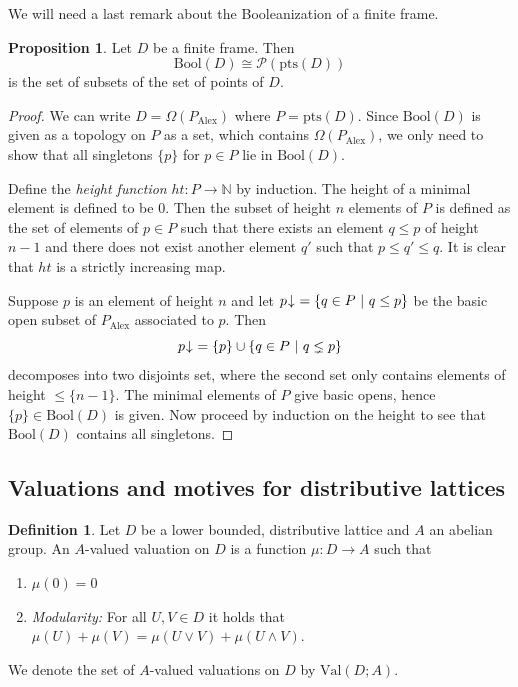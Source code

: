 \documentclass[10pt]{amsart}
\theoremstyle{definition}
\newtheorem{proposition}[theorem]{Proposition}
\newtheorem{definition}[theorem]{Definition}
\begin{document}
We will need a last remark about the Booleanization of a finite frame.

\begin{proposition} \label{finiteboolean}
Let $D$ be a finite frame. Then $$\mathrm{Bool}(D) \cong \mathcal{P}( \mathrm{pts}(D) )$$
is the set of subsets of the set of points of $D$.
\end{proposition}


\begin{proof}
We can write $D = \Omega(P_{\mathrm{Alex}})$ where $P = \mathrm{pts}(D)$. Since $\mathrm{Bool}(D)$ is given as a topology on $P$ as a set, which contains $\Omega(P_{\mathrm{Alex}})$, we only need to show that all singletons $\{p\}$ for $p \in P$ lie in $\mathrm{Bool}(D)$.

Define the \emph{height function} $ht : P \rightarrow \mathbb{N}$ by induction. The height of a minimal element is defined to be $0$. Then the subset of height $n$ elements of $P$ is defined as the set of elements of $p \in P$ such that there exists an element $q \leq p$ of height $n-1$ and there does not exist another element $q'$ such that $p \leq q' \leq q$. It is clear that $ht$ is a strictly increasing map.

Suppose $p$ is an element of height $n$ and let $p \hspace{-0.5ex}\downarrow ~= \{ q \in P ~|~ q \leq p \}$ be the basic open subset of $P_{\mathrm{Alex}}$ associated to $p$. Then
$$p \hspace{-0.5ex}\downarrow ~= \{p\} \cup \{ q \in P ~|~ q \lneq p \}$$
decomposes into two disjoints set, where the second set only contains elements of height $\leq \{n-1\}$. The minimal elements of $P$ give basic opens, hence $\{p\} \in \mathrm{Bool}(D)$ is given. Now proceed by induction on the height to see that $\mathrm{Bool}(D)$ contains all singletons.
\end{proof}


\subsection{Valuations and motives for distributive lattices}
\label{sectionvaluations}

\begin{definition}
Let $D$ be a lower bounded, distributive lattice and $A$ an abelian group. An $A$-valued valuation on $D$ is a function $\mu : D \rightarrow A$ such that
\begin{enumerate}
\item $\mu(0) = 0$
\item \emph{Modularity:} For all $U, V \in D$ it holds that $\mu(U) + \mu(V) = \mu(U \vee V) + \mu(U \wedge V)$.
\end{enumerate}
We denote the set of $A$-valued valuations on $D$ by $\mathrm{Val}(D;A)$.
\end{definition}
\end{document}
